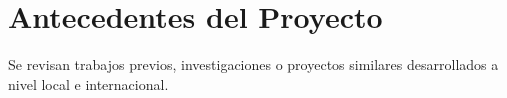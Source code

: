 \section{Antecedentes del Proyecto}
Se revisan trabajos previos, investigaciones o proyectos similares desarrollados a nivel local e internacional.
